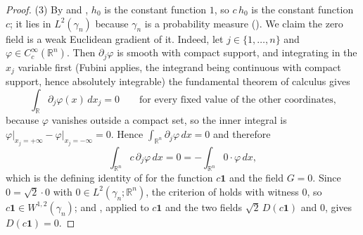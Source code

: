 \begin{proof}
(3) By  and , $h_0$ is the constant
function $1$, so $c\,h_0$ is the constant function $c$; it lies in
$L^2(\gamma_n)$ because $\gamma_n$ is a probability measure
().  We claim the zero field is a weak Euclidean gradient
of it.  Indeed, let $j \in \{1,\ldots,n\}$ and $\varphi \in C_c^\infty(\mathbb{R}^n)$.
Then $\partial_j \varphi$ is smooth with compact support, and integrating in the
$x_j$ variable first (Fubini applies, the integrand being continuous with compact
support, hence absolutely integrable) the fundamental theorem of calculus gives
\[
  \int_{\mathbb{R}} \partial_j \varphi(x)\, dx_j = 0
  \qquad\text{for every fixed value of the other coordinates,}
\]
because $\varphi$ vanishes outside a compact set, so the inner integral is
$\varphi\big|_{x_j = +\infty} - \varphi\big|_{x_j=-\infty} = 0$.  Hence
$\int_{\mathbb{R}^n}\partial_j\varphi\, dx = 0$ and therefore
\[
  \int_{\mathbb{R}^n} c\,\partial_j\varphi\, dx = 0 = -\int_{\mathbb{R}^n} 0\cdot\varphi\, dx ,
\]
which is the defining identity of  for the function
$c\mathbf{1}$ and the field $G = 0$.  Since $0 = \sqrt2\cdot 0$ with
$0 \in L^2(\gamma_n;\mathbb{R}^n)$, the criterion of  holds
with witness $0$, so $c\mathbf{1} \in W^{1,2}(\gamma_n)$; and
, applied to $c\mathbf{1}$ and the two fields
$\sqrt2\,D(c\mathbf{1})$ and $0$, gives $D(c\mathbf{1}) = 0$.
\end{proof}
